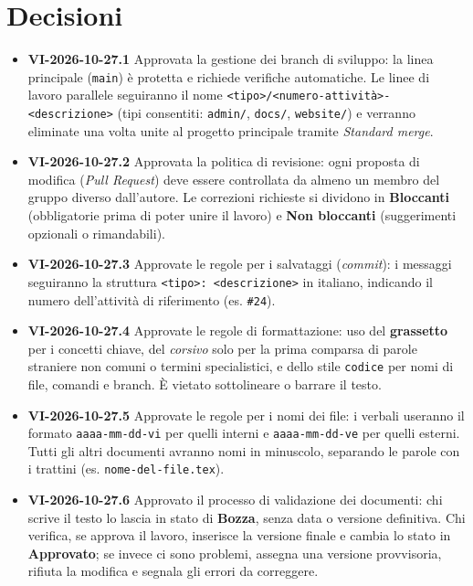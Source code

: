 \documentclass[11pt, a4paper]{article}
\begin{document}
\section{Decisioni}
\begin{itemize}
    \item \textbf{VI-2026-10-27.1} Approvata la gestione dei branch di sviluppo: la linea principale (\texttt{main}) è protetta e richiede verifiche automatiche. Le linee di lavoro parallele seguiranno il nome \texttt{<tipo>/<numero-attività>-<descrizione>} (tipi consentiti: \texttt{admin/}, \texttt{docs/}, \texttt{website/}) e verranno eliminate una volta unite al progetto principale tramite \textit{Standard merge}.
    \item \textbf{VI-2026-10-27.2} Approvata la politica di revisione: ogni proposta di modifica (\textit{Pull Request}) deve essere controllata da almeno un membro del gruppo diverso dall'autore. Le correzioni richieste si dividono in \textbf{Bloccanti} (obbligatorie prima di poter unire il lavoro) e \textbf{Non bloccanti} (suggerimenti opzionali o rimandabili).
    \item \textbf{VI-2026-10-27.3} Approvate le regole per i salvataggi (\textit{commit}): i messaggi seguiranno la struttura \texttt{<tipo>: <descrizione>} in italiano, indicando il numero dell'attività di riferimento (es. \texttt{\#24}).
    \item \textbf{VI-2026-10-27.4} Approvate le regole di formattazione: uso del \textbf{grassetto} per i concetti chiave, del \textit{corsivo} solo per la prima comparsa di parole straniere non comuni o termini specialistici, e dello stile \texttt{codice} per nomi di file, comandi e branch. È vietato sottolineare o barrare il testo.
    \item \textbf{VI-2026-10-27.5} Approvate le regole per i nomi dei file: i verbali useranno il formato \texttt{aaaa-mm-dd-vi} per quelli interni e \texttt{aaaa-mm-dd-ve} per quelli esterni. Tutti gli altri documenti avranno nomi in minuscolo, separando le parole con i trattini (es. \texttt{nome-del-file.tex}).
    \item \textbf{VI-2026-10-27.6} Approvato il processo di validazione dei documenti: chi scrive il testo lo lascia in stato di \textbf{Bozza}, senza data o versione definitiva. Chi verifica, se approva il lavoro, inserisce la versione finale e cambia lo stato in \textbf{Approvato}; se invece ci sono problemi, assegna una versione provvisoria, rifiuta la modifica e segnala gli errori da correggere.
\end{itemize}
\end{document}

